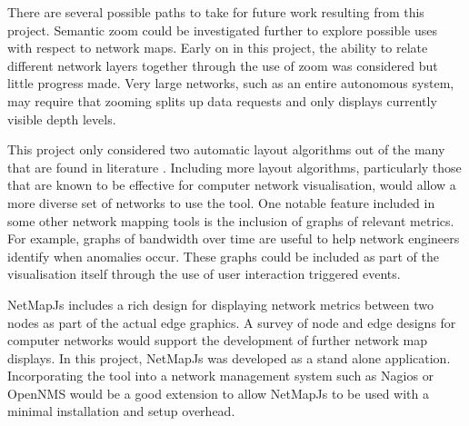 \documentclass[11pt, a4paper]{article}
\begin{document}

There are several possible paths to take for future work resulting from this
project. Semantic zoom could be investigated further to explore possible uses
with respect to network maps. Early on in this project, the ability to relate
different network layers together through the use of zoom was considered but
little progress made. Very large networks, such as an entire autonomous system,
may require that zooming splits up data requests and only displays currently
visible depth levels. 

This project only considered two automatic layout algorithms out of the many
that are found in literature \cite{Battista_1994}. Including more layout
algorithms, particularly those that are known to be effective for computer
network visualisation, would allow a more diverse set of networks to use the
tool. One notable feature included in some other network mapping tools is the
inclusion of graphs of relevant metrics. For example, graphs of bandwidth over
time are useful to help network engineers identify when anomalies occur.  These
graphs could be included as part of the visualisation itself through the use of
user interaction triggered events.

NetMapJs includes a rich design for displaying network metrics between two nodes
as part of the actual edge graphics. A survey of node and edge designs for
computer networks would support the development of further network map displays.
In this project, NetMapJs was developed as a stand alone application.
Incorporating the tool into a network management system such as
Nagios \cite{Nagios_website} or OpenNMS \cite{OpenNMS_website} would be a good
extension to allow NetMapJs to be used with a minimal installation and setup
overhead.


\newpage





\newpage

\appendix
\appendixpage
\end{document}
